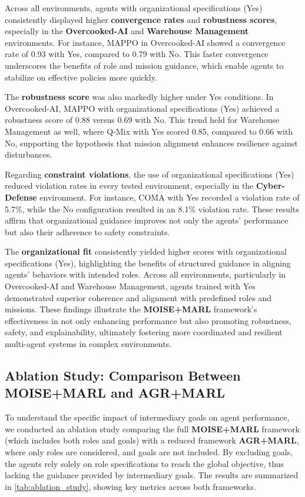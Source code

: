 \documentclass[sigconf,anonymous]{aamas}
\begin{document}
Across all environments, agents with organizational specifications (Yes) consistently displayed higher \textbf{convergence rates} and \textbf{robustness scores}, especially in the \textbf{Overcooked-AI} and \textbf{Warehouse Management} environments. For instance, MAPPO in Overcooked-AI showed a convergence rate of 0.93 with Yes, compared to 0.79 with No. This faster convergence underscores the benefits of role and mission guidance, which enable agents to stabilize on effective policies more quickly.

The \textbf{robustness score} was also markedly higher under Yes conditions. In Overcooked-AI, MAPPO with organizational specifications (Yes) achieved a robustness score of 0.88 versus 0.69 with No. This trend held for Warehouse Management as well, where Q-Mix with Yes scored 0.85, compared to 0.66 with No, supporting the hypothesis that mission alignment enhances resilience against disturbances.

Regarding \textbf{constraint violations}, the use of organizational specifications (Yes) reduced violation rates in every tested environment, especially in the \textbf{Cyber-Defense} environment. For instance, COMA with Yes recorded a violation rate of 5.7\%, while the No configuration resulted in an 8.1\% violation rate. These results affirm that organizational guidance improves not only the agents' performance but also their adherence to safety constraints.

The \textbf{organizational fit} consistently yielded higher scores with organizational specifications (Yes), highlighting the benefits of structured guidance in aligning agents' behaviors with intended roles. Across all environments, particularly in Overcooked-AI and Warehouse Management, agents trained with Yes demonstrated superior coherence and alignment with predefined roles and missions. These findings illustrate the \textbf{MOISE+MARL} framework's effectiveness in not only enhancing performance but also promoting robustness, safety, and explainability, ultimately fostering more coordinated and resilient multi-agent systems in complex environments.


\subsection{Ablation Study: Comparison Between MOISE+MARL and AGR+MARL}

To understand the specific impact of intermediary goals on agent performance, we conducted an ablation study comparing the full \textbf{MOISE+MARL} framework (which includes both roles and goals) with a reduced framework \textbf{AGR+MARL}, where only roles are considered, and goals are not included. By excluding goals, the agents rely solely on role specifications to reach the global objective, thus lacking the guidance provided by intermediary goals.
The results are summarized in \autoref{tab:ablation_study}, showing key metrics across both frameworks.
\end{document}
